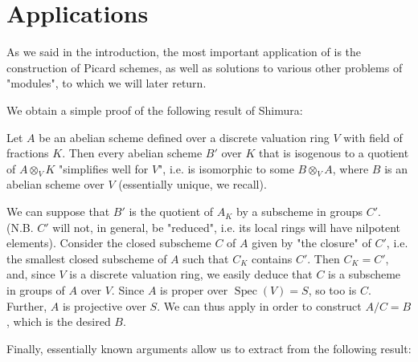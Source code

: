\section{Applications}\label{fga3.iii-7}



As we said in the introduction, the most important application of  is the construction of Picard schemes, as well as solutions to various other problems of "modules", to which we will later return.



We obtain a simple proof of the following result of Shimura:

\begin{proposition}\label{fga3.iii-7-proposition-7.1}
    Let $A$ be an abelian scheme defined over a discrete valuation ring $V$ with field of fractions $K$.
    Then every abelian scheme $B'$ over $K$ that is isogenous to a quotient of $A\otimes_V K$ "simplifies well for $V$", i.e. is isomorphic to some $B\otimes_V A$, where $B$ is an abelian scheme over $V$ (essentially unique, we recall).
\end{proposition}


\begin{cproof}
    We can suppose that $B'$ is the quotient of $A_K$ by a subscheme in groups $C'$.
    (N.B. $C'$ will not, in general, be "reduced", i.e. its local rings will have nilpotent elements).
    Consider the closed subscheme $C$ of $A$ given by "the closure" of $C'$, i.e. the smallest closed subscheme of $A$ such that $C_K$ contains $C'$.
    Then $C_K=C'$, and, since $V$ is a discrete valuation ring, we easily deduce that $C$ is a subscheme in groups of $A$ over $V$.
    Since $A$ is proper over $\operatorname{Spec}(V)=S$, so too is $C$.
    Further, $A$ is projective over $S$.
    We can thus apply  in order to construct $A/C=B$, which is the desired $B$.
\end{cproof}


Finally, essentially known arguments allow us to extract from  the following result:


